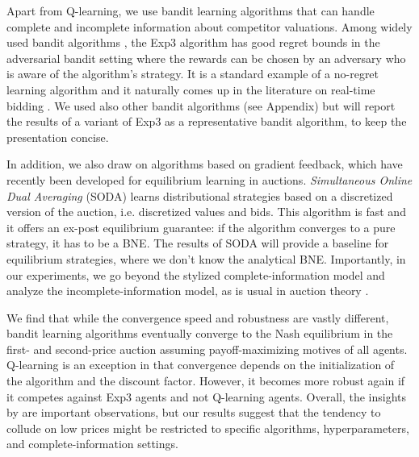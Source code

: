 \documentclass{article}
\begin{document}
Apart from Q-learning, we use bandit learning algorithms that can handle complete and incomplete information about competitor valuations. Among widely used bandit algorithms \citep{lattimore2020bandit}, the Exp3 algorithm has good regret bounds in the adversarial bandit setting where the rewards can be chosen by an adversary who is aware of the algorithm's strategy. 
It is a standard example of a no-regret learning algorithm and it naturally comes up in the literature on real-time bidding \citep{heidari2016pricing,rhuggenaath2019pso,tilli2021multi}. 
We used also other bandit algorithms (see Appendix) but will report the results of a variant of Exp3 as a representative bandit algorithm, to keep the presentation concise.  

In addition, we also draw on algorithms based on gradient feedback, which have recently been developed for equilibrium learning in auctions. \textit{Simultaneous Online Dual Averaging} (SODA) \citep{bichler2023soda} learns distributional strategies based on a discretized version of the auction, i.e. discretized values and bids. This algorithm is fast and it offers an ex-post equilibrium guarantee: if the algorithm converges to a pure strategy, it has to be a BNE. The results of SODA will provide a baseline for equilibrium strategies, where we don't know the analytical BNE. Importantly, in our experiments, we go beyond the stylized complete-information model and analyze the incomplete-information model, as is usual in auction theory \citep{krishna2009auction}.  

We find that while the convergence speed and robustness are vastly different, bandit learning algorithms eventually converge to the Nash equilibrium in the first- and second-price auction assuming payoff-maximizing motives of all agents. Q-learning is an exception in that convergence depends on the initialization of the algorithm and the discount factor. However, it becomes more robust again if it competes against Exp3 agents and not Q-learning agents. 
Overall, the insights by \citet{banchio2022artificial} are important observations, but our results suggest that the tendency to collude on low prices might be restricted to specific algorithms, hyperparameters, and complete-information settings. 
\end{document}

